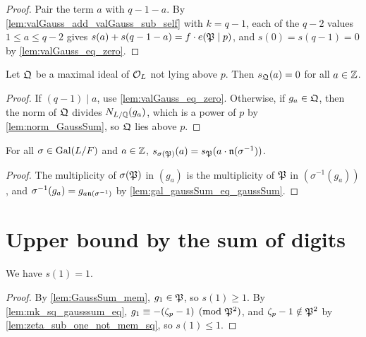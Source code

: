 \begin{proof}
  \leanok
  Pair the term $a$ with $q - 1 - a$. By \ref{lem:valGauss_add_valGauss_sub_self} with
  $k = q - 1$, each of the $q - 2$ values $1 \leq a \leq q-2$ gives
  $s(a) + s(q-1-a) = f \cdot e(\mathfrak{P} \mid p)$, and $s(0) = s(q-1) = 0$ by
  \ref{lem:valGauss_eq_zero}.
\end{proof}

\begin{lemma}
  \label{lem:valGauss_eq_zero_of_not_liesOver}
  \leanok
  Let $\mathfrak{Q}$ be a maximal ideal of $\mathcal{O}_L$ not lying above $p$. Then $s_{\mathfrak{Q}}(a) = 0$ for all
  $a \in \mathbb{Z}$.
\end{lemma}

\begin{proof}
  \leanok
  If $(q-1) \mid a$, use \ref{lem:valGauss_eq_zero}. Otherwise, if $g_a \in \mathfrak{Q}$, then the norm
  of $\mathfrak{Q}$ divides $N_{L/\mathbb{Q}}(g_a)$, which is a power of $p$ by \ref{lem:norm_GaussSum}, so
  $\mathfrak{Q}$ lies above $p$.
\end{proof}

\begin{lemma}
  \label{lem:valGauss_smul}
  \leanok
  For all $\sigma \in \mathrm{Gal}(L/F)$ and $a \in \mathbb{Z}$,
  $s_{\sigma(\mathfrak{P})}(a) = s_{\mathfrak{P}}(a \cdot \mathfrak{n}(\sigma^{-1}))$.
\end{lemma}

\begin{proof}
  \leanok
  The multiplicity of $\sigma(\mathfrak{P})$ in $(g_a)$ is the multiplicity of $\mathfrak{P}$ in
  $(\sigma^{-1}(g_a))$, and $\sigma^{-1}(g_a) = g_{a \mathfrak{n}(\sigma^{-1})}$ by
  \ref{lem:gal_gaussSum_eq_gaussSum}.
\end{proof}

\section{Upper bound by the sum of digits}

\begin{lemma}
  \label{lem:valGauss_one}
  \leanok
  We have $s(1) = 1$.
\end{lemma}

\begin{proof}
  \leanok
  By \ref{lem:GaussSum_mem}, $g_1 \in \mathfrak{P}$, so $s(1) \geq 1$.
  By \ref{lem:mk_sq_gausssum_eq}, $g_1 \equiv -(\zeta_p - 1) \pmod{\mathfrak{P}^2}$, and
  $\zeta_p - 1 \notin \mathfrak{P}^2$ by \ref{lem:zeta_sub_one_not_mem_sq}, so $s(1) \leq 1$.
\end{proof}

